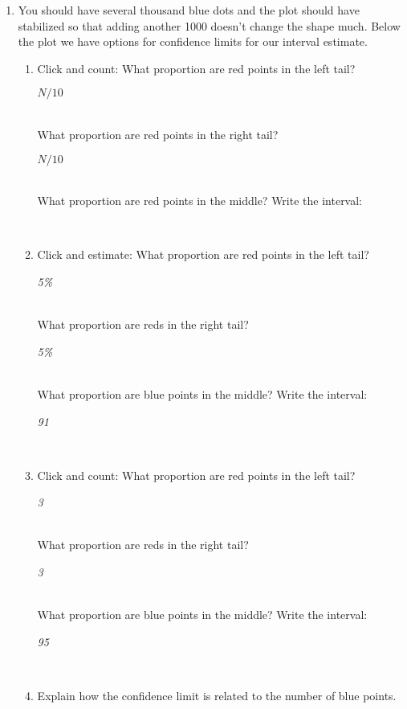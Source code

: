 \begin{enumerate}
 \item You should have several thousand blue dots and the plot should have
   stabilized so that adding another 1000 doesn't change the shape much.
   Below the plot we have options for confidence limits for our
   interval estimate.
   \begin{enumerate}
   \item Click  and count:   What proportion are red points
     in the left tail? 
\begin{key}
{\it  $N/10$}
\end{key}
     \\
      What proportion are red points in the right tail?
\begin{key}
{\it  $N/10$}
\end{key}
     \\
      What proportion are red points in the  middle?  \hfill Write the interval:
\begin{key}
{\it  80\}
\end{key}
     \\
   \item Click  and estimate: What proportion are red points in the left tail?
\begin{key}
{\it  5\%}
\end{key}
     \\
      What proportion are reds in the right tail?
\begin{key}
{\it  5\%}
\end{key}
     \\
      What proportion are blue points in the middle? \hfill Write the interval:
\begin{key}
{\it  91}
\end{key}
     \\
  \item Click  and count:   What proportion are red points in the left tail?
\begin{key}
{\it  3}
\end{key}
     \\
      What proportion are reds in the right tail?
\begin{key}
{\it  3}
\end{key}
     \\
      What proportion are blue points in the middle? \hfill Write the interval:
\begin{key}
{\it  95}
\end{key}
     \\
   \item Explain how the confidence limit is related to the number of
     blue points.
\begin{students}
  \vspace{1cm}
\end{students}


\end{enumerate}
\end{enumerate}
